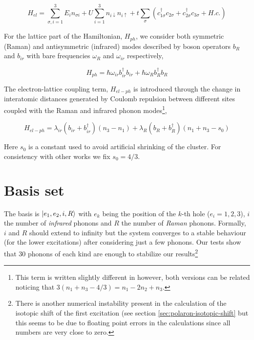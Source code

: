 \begin{equation}\label{eq:electronic-part}
H_{el} = \sum_{\sigma,i=1}^3 E_i n_{\sigma i} + U\sum_{i=1}^3 n_{i\downarrow}n_{i\uparrow} + t\sum_{\sigma}(c_{1\sigma}^\dagger c_{2\sigma} + c_{2\sigma}^\dagger c_{3\sigma} + H.c.)
\end{equation}

For the lattice  part of the Hamiltonian, $H_{ph}$, we consider both symmetric (Raman) and antisymmetric (infrared) modes described by boson operators $b_R$ and $b_{ir}$ with bare frequencies $\omega_R$ and $\omega_{ir}$ respectively,
 
\begin{equation}\label{eq:phonon-part}
H_{ph} = \hbar \omega_{ir}b_{ir}^\dagger b_{ir} + \hbar \omega_R b_R^\dagger b_R
\end{equation}

 
The electron-lattice coupling term, $H_{el-ph}$ is introduced through the change in interatomic distances generated by Coulomb repulsion between different sites coupled with the Raman and infrared phonon modes\footnote{This term is written slightly different in \cite{MustredeLeon1992} however, both versions can be related noticing that $3 (n_1+n_3-4/3)=n_1-2n_2+n_3$.},
 
\begin{equation}\label{eq:coupling-part}
H_{el-ph} = \lambda_{ir}(b_{ir} + b_{ir}^\dagger)(n_3 - n_1) + \lambda_R (b_R + b_R^\dagger)(n_1 + n_3-s_0)
\end{equation}

Here $s_0$ is a constant used to avoid artificial shrinking of the cluster. 
For consistency with other works \cite{MustredeLeon1992,DeLeon1999,Leon2008,MirandaMena2007} we fix $s_0=4/3$.


\section{Basis set}
\label{sec:basis-set}

The basis is $\left | e_1,e_2,i,R \right\rangle$ with $e_k$ being the position of the $k$-th hole ($e_i=1,2,3$), $i$ the number of \textit{infrared} phonons and $R$ the number of \textit{Raman} phonons. 
Formally, $i$ and $R$ should extend to infinity but the system converges to a stable behaviour (for the lower excitations) after considering just a few phonons. 
Our tests show that 30 phonons of each kind are enough to stabilize our results\footnote{There is another numerical instability present in the calculation of the isotopic shift of the first excitation (see section \ref{sec:polaron-isotopic-shift} but this seems to be due to floating point errors in the calculations since all numbers are very close to zero.}

